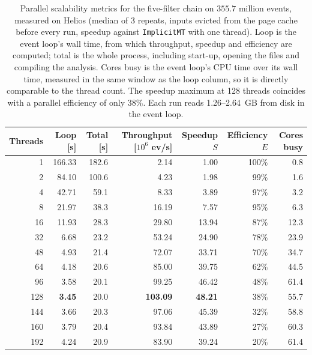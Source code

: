 \begin{table}[htbp]
\centering
\caption{Parallel scalability metrics for the five-filter chain on $355.7$ million events, measured on Helios (median of 3 repeats, inputs evicted from the page cache before every run, speedup against \texttt{ImplicitMT} with one thread). Loop is the event loop's wall time, from which throughput, speedup and efficiency are computed; total is the whole process, including start-up, opening the files and compiling the analysis. Cores busy is the event loop's CPU time over its wall time, measured in the same window as the loop column, so it is directly comparable to the thread count. The speedup maximum at 128 threads coincides with a parallel efficiency of only $38\%$. Each run reads 1.26--2.64~GB from disk in the event loop.}
\label{tab:scalability-chain}
\setlength{\tabcolsep}{5pt}
\begin{tabular}{rrrrrrr}
\toprule
Threads & Loop [s] & Total [s] & Throughput [$10^6$ ev/s] & Speedup $S$ & Efficiency $E$ & Cores busy \\
\midrule
 1 & 166.33 & 182.6 & 2.14 & 1.00 & 100\% & 0.8 \\
 2 & 84.10 & 100.6 & 4.23 & 1.98 & 99\% & 1.6 \\
 4 & 42.71 & 59.1 & 8.33 & 3.89 & 97\% & 3.2 \\
 8 & 21.97 & 38.3 & 16.19 & 7.57 & 95\% & 6.3 \\
16 & 11.93 & 28.3 & 29.80 & 13.94 & 87\% & 12.3 \\
32 & 6.68 & 23.2 & 53.24 & 24.90 & 78\% & 23.9 \\
48 & 4.93 & 21.4 & 72.07 & 33.71 & 70\% & 34.7 \\
64 & 4.18 & 20.6 & 85.00 & 39.75 & 62\% & 44.5 \\
96 & 3.58 & 20.1 & 99.25 & 46.42 & 48\% & 61.4 \\
128 & \textbf{3.45} & 20.0 & \textbf{103.09} & \textbf{48.21} & 38\% & 55.7 \\
144 & 3.66 & 20.3 & 97.06 & 45.39 & 32\% & 58.8 \\
160 & 3.79 & 20.4 & 93.84 & 43.89 & 27\% & 60.3 \\
192 & 4.24 & 20.9 & 83.90 & 39.24 & 20\% & 61.4 \\
\bottomrule
\end{tabular}
\end{table}

